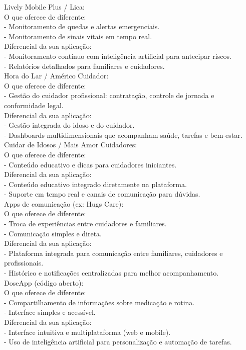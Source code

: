 Lively Mobile Plus / Lica:\\
 O que oferece de diferente:\\
-  Monitoramento de quedas e alertas emergenciais.\\
-  Monitoramento de sinais vitais em tempo real.\\
 Diferencial da sua aplicação:\\
-  Monitoramento contínuo com inteligência artificial para antecipar riscos.\\
-  Relatórios detalhados para familiares e cuidadores.\\

Hora do Lar / Américo Cuidador:\\
 O que oferece de diferente:\\
-  Gestão do cuidador profissional: contratação, controle de jornada e conformidade legal.\\
 Diferencial da sua aplicação:\\
-  Gestão integrada do idoso e do cuidador.\\
-  Dashboards multidimensionais que acompanham saúde, tarefas e bem-estar.\\

Cuidar de Idosos / Mais Amor Cuidadores:\\
 O que oferece de diferente:\\
-  Conteúdo educativo e dicas para cuidadores iniciantes.\\
 Diferencial da sua aplicação:\\
-  Conteúdo educativo integrado diretamente na plataforma.\\
-  Suporte em tempo real e canais de comunicação para dúvidas.\\

Apps de comunicação (ex: Hugs Care):\\
 O que oferece de diferente:\\
-  Troca de experiências entre cuidadores e familiares.\\
-  Comunicação simples e direta.\\
 Diferencial da sua aplicação:\\
-  Plataforma integrada para comunicação entre familiares, cuidadores e profissionais.\\
-  Histórico e notificações centralizadas para melhor acompanhamento.\\

DoseApp (código aberto):\\
 O que oferece de diferente:\\
-  Compartilhamento de informações sobre medicação e rotina.\\
-  Interface simples e acessível.\\
Diferencial da sua aplicação:\\
-  Interface intuitiva e multiplataforma (web e mobile).\\
-  Uso de inteligência artificial para personalização e automação de tarefas.\\
